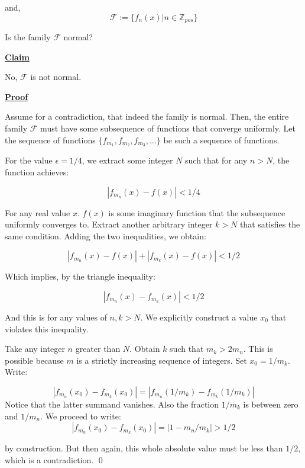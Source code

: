 \documentclass{article}
\newcommand{\new}[1]{
    \vspace{2mm}
    \noindent
    \textbf{
    \underline{#1}}
}
\def\ZZ{{\mathbb{Z}}}
\newcommand{\Proof}{{
    \vspace{2mm}
    \noindent
    \textbf{
    \underline{Proof}}
}
}
\begin{document}
and,
\[
    \mathcal{F}:= \{f_n(x)|n \in \ZZ_{pos}\}
\]

Is the family $\mathcal{F}$ normal?

\new{Claim}
No, $\mathcal{F}$ is not normal. 

\Proof
Assume for a contradiction, that indeed the family is normal. 
Then, the entire family $\mathcal{F}$ must have some subsequence
of functions that converge uniformly. Let the sequence of functions 
$\{f_{m_1}, f_{m_2}, f_{m_3}, \dots \}$ be such a sequence of functions.

For the value $\epsilon = 1/4$, we extract some integer $N$ such that 
for any $n > N$, the function achieves:

\[
    |f_{m_n}(x)-f(x)| < 1/4
\]

For any real value $x$. $f(x)$ is some imaginary function 
that the subsequence uniformly converges to. Extract another 
arbitrary integer $k > N$ that satisfies the same condition. 
Adding the two inequalities, we obtain:

\[
    |f_{m_n}(x)-f(x)| + |f_{m_k}(x)-f(x)| < 1/2
\]

Which implies, by the triangle inequality:

\[
    |f_{m_n}(x) - f_{m_k}(x)| < 1/2
\]

And this is for any values of $n, k > N$. 
We explicitly construct a value $x_0$ that violates 
this inequality. 

Take any integer $n$ greater than $N$. Obtain 
$k$ such that $m_k > 2m_n$. This is possible because 
$m$ is a strictly increasing sequence of integers. 
Set $x_0 = 1/m_k$. Write:

\[
|f_{m_n}(x_0) - f_{m_k}(x_0)| = |f_{m_n}(1/m_k)-f_{m_k}(1/m_k)|
\]
Notice that the latter summand vanishes. Also the fraction 
$1/m_k$ is between zero and $1/m_n$. We proceed to write:
\[
    |f_{m_n}(x_0) - f_{m_k}(x_0)| = |1-m_n/m_k| > 1/2
\]

by construction. But then again, this whole absolute value 
must be less than $1/2$, which is a contradiction. \qed
\end{document}
